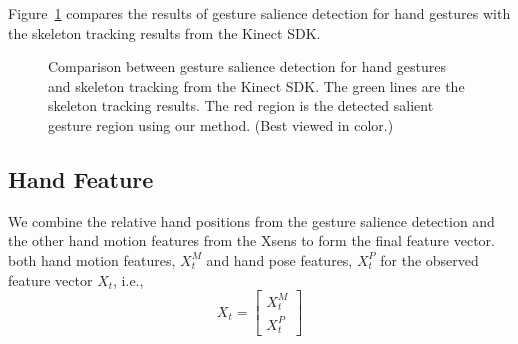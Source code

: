 \documentclass{acm_proc_article-sp}
\begin{document}
Figure~\ref{fig:compare-skeleton} compares the results of gesture salience detection for hand gestures with the skeleton tracking results
from the Kinect SDK.
\begin{figure}
\centering
{}
\caption{Comparison between gesture salience detection for hand gestures and skeleton tracking from the Kinect SDK. The green lines are
the skeleton tracking results. The red region is the detected salient gesture
region using our method. (Best viewed in color.)}
\label{fig:compare-skeleton}
\end{figure}

\subsection{Hand Feature}
We combine the relative hand positions from the gesture salience detection and the other hand 
motion features from the Xsens to form the final feature vector. both hand motion features, $X^M_t$ and hand pose features, $X^P_t$
for the observed feature vector $X_t$, i.e., 
\begin{displaymath}
X_t = \left[ \begin{array}{c}
X^M_t\\
X^P_t
\end{array}\right]
\end{displaymath} 
\end{document}
